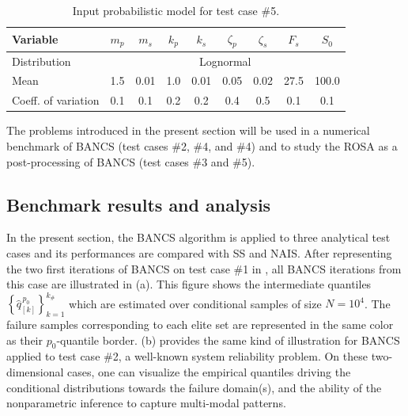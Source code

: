 \begin{table}[h]
\centering
\begin{tabular}{ lcccccccc }
    \hline
    Variable            & $m_p$ & $m_s$ & $k_p$ & $k_s$ & $\zeta_p$ & $\zeta_s$ & $F_s$ & $S_0$ \\
    \hline          
    Distribution        &  \multicolumn{8}{c}{Lognormal} \\ 
    Mean                & 1.5 & 0.01 & 1.0 & 0.01 & 0.05 & 0.02 & 27.5 & 100.0\\ 
    Coeff. of variation & 0.1 & 0.1 & 0.2 & 0.2 & 0.4 & 0.5 & 0.1 & 0.1\\
    \hline
\end{tabular}
\caption{Input probabilistic model for test case \#5.}
\label{tab:oscillator}
\end{table}

The problems introduced in the present section will be used in a numerical benchmark of BANCS (test cases \#2, \#4, and \#4) and to study the ROSA as a post-processing of BANCS (test cases \#3 and \#5). 

\subsection{Benchmark results and analysis}

In the present section, the BANCS algorithm is applied to three analytical test cases and its performances are compared with SS and NAIS. 
After representing the two first iterations of BANCS on test case \#1 in , all BANCS iterations from this case are illustrated in  (a). 
This figure shows the intermediate quantiles $\left\{\widehat{q}_{[k]}^{\, p_0}\right\}_{k=1}^{k_\#}$ which are estimated over conditional samples of size $N=10^4$. 
The failure samples corresponding to each elite set are represented in the same color as their $p_0$-quantile border. 
 (b) provides the same kind of illustration for BANCS applied to test case \#2, a well-known system reliability problem. 
On these two-dimensional cases, one can visualize the empirical quantiles driving the conditional distributions towards the failure domain(s), and the ability of the nonparametric inference to capture multi-modal patterns.  

